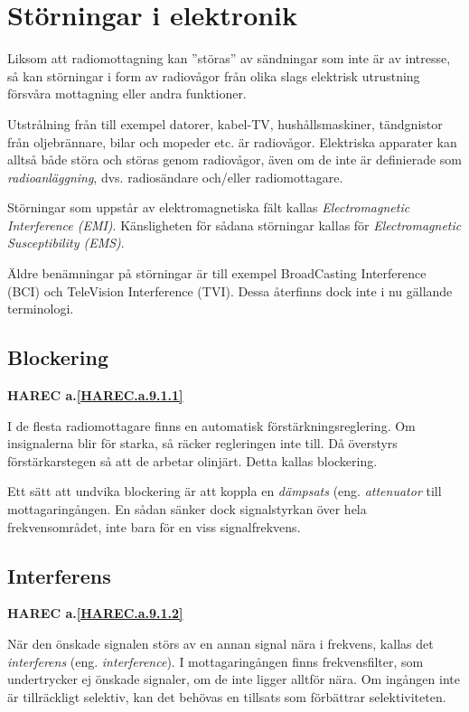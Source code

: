 \section{Störningar i elektronik}

Liksom att radiomottagning kan ''störas'' av sändningar som inte är av
intresse, så kan störningar i form av radiovågor från olika slags
elektrisk utrustning försvåra mottagning eller andra funktioner.

Utstrålning från till exempel datorer, kabel-TV, hushållsmaskiner,
tändgnistor från oljebrännare, bilar och mopeder etc. är radiovågor.
Elektriska apparater kan alltså både störa och störas genom
radiovågor, även om de inte är definierade som \emph{radioanläggning},
dvs. radiosändare och/eller radiomottagare.

Störningar som uppstår av elektromagnetiska fält kallas
\emph{Electromagnetic Interference (EMI)}.
Känsligheten för sådana störningar kallas för
\emph{Electromagnetic Susceptibility (EMS)}.

Äldre benämningar på störningar är till exempel BroadCasting Interference (BCI) och
TeleVision Interference (TVI).
Dessa återfinns dock inte i nu gällande terminologi.

\subsection{Blockering}
\textbf{
HAREC a.\ref{HAREC.a.9.1.1}\label{myHAREC.a.9.1.1}
}

I de flesta radiomottagare finns en automatisk förstärkningsreglering.
Om insignalerna blir för starka, så räcker regleringen inte till.
Då överstyrs förstärkarstegen så att de arbetar olinjärt.
Detta kallas blockering.

Ett sätt att undvika blockering är att koppla en \emph{dämpsats}
(eng. \emph{attenuator} till mottagaringången.
En sådan sänker dock signalstyrkan över hela frekvensområdet, inte bara för en
viss signalfrekvens.

\subsection{Interferens}
\textbf{
HAREC a.\ref{HAREC.a.9.1.2}\label{myHAREC.a.9.1.2}
}

När den önskade signalen störs av en annan signal nära i frekvens, kallas det
\emph{interferens} (eng. \emph{interference}).
I mottagaringången finns frekvensfilter, som undertrycker ej önskade signaler,
om de inte ligger alltför nära.
Om ingången inte är tillräckligt selektiv, kan det behövas en tillsats som
förbättrar selektiviteten.

